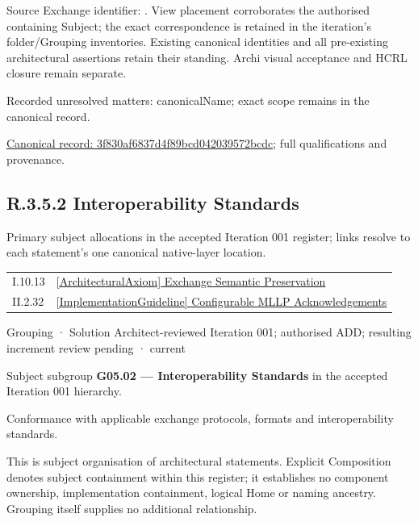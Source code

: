 Source Exchange identifier: \texttt{}. View placement corroborates
the authorised containing Subject; the exact correspondence is retained in the
iteration's folder/Grouping inventories. Existing canonical identities and all
pre-existing architectural assertions retain their standing. Archi visual
acceptance and HCRL closure remain separate.


{\small Recorded unresolved matters: canonicalName; exact scope remains in the canonical record.}\par
{\footnotesize \href{../../../../continuum/grouping/3f830af6837d4f89bcd042039572bcdc.md}{Canonical record: 3f830af6837d4f89bcd042039572bcdc}; full qualifications and provenance.}\par
\subsection*{R.3.5.2 Interoperability Standards}
\label{navigation:R.3.5.2}

Primary subject allocations in the accepted Iteration 001 register; links resolve to each statement’s one canonical native-layer location.\par
\begin{longtable}{p{.22\linewidth}p{.73\linewidth}}
I.10.13 & \hyperref[element:602eb50793f448d8bdbc92d41f851877]{[ArchitecturalAxiom] Exchange Semantic Preservation} \\
II.2.32 & \hyperref[element:ab4206c7312449569abaa818b3a8727a]{[ImplementationGuideline] Configurable MLLP Acknowledgements} \\
\end{longtable}
\label{element:a44091225174403ebd2c5b75ba690a09}
{\small Grouping · Solution Architect-reviewed Iteration 001; authorised ADD; resulting increment review pending · current}\par

Subject subgroup \textbf{G05.02 — Interoperability Standards} in the accepted Iteration 001 hierarchy.



Conformance with applicable exchange protocols, formats and interoperability standards.



This is subject organisation of architectural statements. Explicit Composition denotes subject containment within this register; it establishes no component ownership, implementation containment, logical Home or naming ancestry. Grouping itself supplies no additional relationship.


